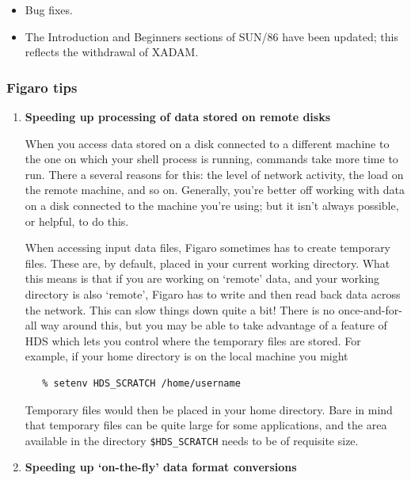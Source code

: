 \documentclass[11pt,twoside]{article}
\begin{document}
\begin{itemize}
\item Bug fixes.

\item The Introduction and Beginners sections of SUN/86 have been
      updated; this reflects the withdrawal of XADAM.

\end{itemize}

\subsubsection{\label{news516_figaro_tips}Figaro tips}

\begin{enumerate}

\item {\bf Speeding up processing of data stored on remote disks}

      When you access data stored on a disk connected to a different
      machine to the one on which your shell process is running,
      commands take more time to run.  There a several reasons for this:
      the level of network activity, the load on the remote machine,
      and so on.  Generally, you're better off working with data on a
      disk connected to the machine you're using; but it isn't always
      possible, or helpful, to do this.

      When accessing input data files, Figaro sometimes has to create
      temporary files.  These are, by default, placed in your current
      working directory.  What this means is that if you are working
      on `remote' data, and your working directory is also `remote',
      Figaro has to write and then read back data across the network.
      This can slow things down quite a bit!  There is no
      once-and-for-all way around this, but you may be able to take
      advantage
      of a feature of HDS which lets you control where the temporary
      files are stored.  For example, if your home directory
      is on the local machine you might

\begin{verbatim}
   % setenv HDS_SCRATCH /home/username
\end{verbatim}

      Temporary files would then be placed in your home directory.
      Bare in mind that temporary files can be quite large for some
      applications, and the area available in the directory
      \verb+$HDS_SCRATCH+ needs to be of requisite size.

\item {\bf Speeding up `on-the-fly' data format conversions}


\end{enumerate}
\end{document}
